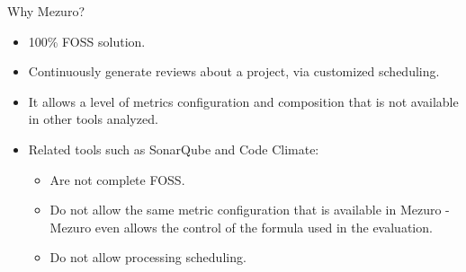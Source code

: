 \begin{block}{Why Mezuro?}

    \begin{itemize}
        \item 100\% FOSS solution.

        \item Continuously generate reviews about a project, via customized
            scheduling.

        \item It allows a level of metrics configuration and composition that
            is not available in other tools analyzed.

        \item Related tools such as SonarQube and Code Climate:
            \begin{itemize}
                \item Are not complete FOSS.
                \item Do not allow the same metric configuration that is
                    available in Mezuro - Mezuro even allows the control of
                    the formula used in the evaluation.
                \item Do not allow processing scheduling.
            \end{itemize}

    \end{itemize}
\end{block}
